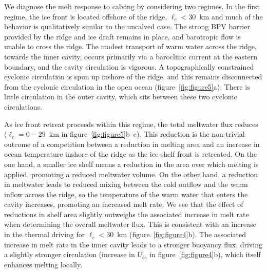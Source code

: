 \documentclass[draft]{agujournal2019}
\begin{document}

We diagnose the melt response to calving by considering two regimes. In the first regime, the ice front is located offshore of the ridge, $\ell_c < 30$~km and much of the behavior is qualitatively similar to the uncalved case. The strong BPV barrier provided by the ridge and ice draft remains in place, and barotropic flow is unable to cross the ridge. The modest transport of warm water across the ridge, towards the inner cavity, occurs primarily via a baroclinic current at the eastern boundary, and the cavity circulation is vigorous. A topographically constrained cyclonic circulation is spun up inshore of the ridge, and this remains disconnected from the cyclonic circulation in the open ocean (figure~\ref{fig:figure5}a). There is little circulation in the outer cavity, which sits between these two cyclonic circulations. 

As ice front retreat proceeds within this regime, the total meltwater flux reduces ($\ell_c = 0-29$~km in figure~\ref{fig:figure5}b--c). This reduction is the non-trivial outcome of a competition between a reduction in melting area and an increase in ocean temperature inshore of the ridge as the ice shelf front is retreated. On the one hand, a smaller ice shelf means a reduction in the area over which melting is applied, promoting a reduced meltwater volume. On the other hand, a reduction in meltwater leads to reduced mixing between the cold outflow and the warm inflow across the ridge, so the temperature of the warm water that enters the cavity increases, promoting an increased melt rate.  We see that the effect of reductions in shelf area slightly outweighs the associated increase in melt rate when determining the overall meltwater flux. This is consistent with an increase in the thermal driving for $\ell_c < 30$~km  (figure~\ref{fig:figure4}b). The associated increase in melt rate in the inner cavity leads to a stronger buoyancy flux, driving a slightly stronger circulation (increase in $U_{be}$ in figure~\ref{fig:figure4}b), which itself enhances melting locally.
\end{document}
